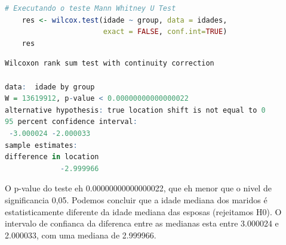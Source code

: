 \begin{lstlisting}[language=R, style=input] 
    # Executando o teste Mann Whitney U Test
    res <- wilcox.test(idade ~ group, data = idades,
                       exact = FALSE, conf.int=TRUE)
    res    
\end{lstlisting}
\begin{lstlisting}[language=R, style=output] 
	Wilcoxon rank sum test with continuity correction

data:  idade by group
W = 13619912, p-value < 0.00000000000000022
alternative hypothesis: true location shift is not equal to 0
95 percent confidence interval:
 -3.000024 -2.000033
sample estimates:
difference in location 
             -2.999966 
\end{lstlisting}
O p-value do teste eh 0.00000000000000022, que eh menor que o nivel de significancia 0,05. Podemos concluir que a idade mediana dos maridos é estatisticamente diferente da idade mediana das esposas (rejeitamos H0). O intervalo de confianca da diferenca entre as medianas esta entre 3.000024 e 2.000033, com uma mediana de 2.999966. 